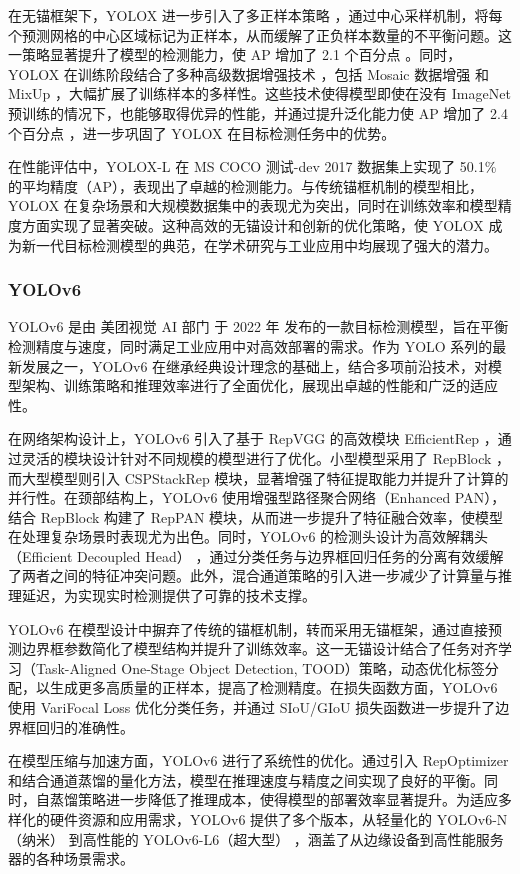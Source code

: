 \documentclass[11pt,twocolumn]{ctexart}
\begin{document}
在无锚框架下，YOLOX 进一步引入了多正样本策略 ，通过中心采样机制，将每个预测网格的中心区域标记为正样本，从而缓解了正负样本数量的不平衡问题。这一策略显著提升了模型的检测能力，使 AP 增加了 2.1 个百分点 。同时，YOLOX 在训练阶段结合了多种高级数据增强技术 ，包括 Mosaic 数据增强 和 MixUp ，大幅扩展了训练样本的多样性。这些技术使得模型即使在没有 ImageNet 预训练的情况下，也能够取得优异的性能，并通过提升泛化能力使 AP 增加了 2.4 个百分点 ，进一步巩固了 YOLOX 在目标检测任务中的优势。

在性能评估中，YOLOX-L 在 MS COCO 测试-dev 2017 数据集上实现了 50.1\% 的平均精度（AP），表现出了卓越的检测能力。与传统锚框机制的模型相比，YOLOX 在复杂场景和大规模数据集中的表现尤为突出，同时在训练效率和模型精度方面实现了显著突破。这种高效的无锚设计和创新的优化策略，使 YOLOX 成为新一代目标检测模型的典范，在学术研究与工业应用中均展现了强大的潜力。
\subsubsection{YOLOv6}
YOLOv6 是由 美团视觉 AI 部门 于 2022 年 发布的一款目标检测模型，旨在平衡检测精度与速度，同时满足工业应用中对高效部署的需求。作为 YOLO 系列的最新发展之一，YOLOv6 在继承经典设计理念的基础上，结合多项前沿技术，对模型架构、训练策略和推理效率进行了全面优化，展现出卓越的性能和广泛的适应性。

在网络架构设计上，YOLOv6 引入了基于 RepVGG 的高效模块 EfficientRep ，通过灵活的模块设计针对不同规模的模型进行了优化。小型模型采用了 RepBlock ，而大型模型则引入 CSPStackRep 模块，显著增强了特征提取能力并提升了计算的并行性。在颈部结构上，YOLOv6 使用增强型路径聚合网络（Enhanced PAN），结合 RepBlock 构建了 RepPAN 模块，从而进一步提升了特征融合效率，使模型在处理复杂场景时表现尤为出色。同时，YOLOv6 的检测头设计为高效解耦头（Efficient Decoupled Head） ，通过分类任务与边界框回归任务的分离有效缓解了两者之间的特征冲突问题。此外，混合通道策略的引入进一步减少了计算量与推理延迟，为实现实时检测提供了可靠的技术支撑。

YOLOv6 在模型设计中摒弃了传统的锚框机制，转而采用无锚框架，通过直接预测边界框参数简化了模型结构并提升了训练效率。这一无锚设计结合了任务对齐学习（Task-Aligned One-Stage Object Detection, TOOD）策略，动态优化标签分配，以生成更多高质量的正样本，提高了检测精度。在损失函数方面，YOLOv6 使用 VariFocal Loss 优化分类任务，并通过 SIoU/GIoU 损失函数进一步提升了边界框回归的准确性。

在模型压缩与加速方面，YOLOv6 进行了系统性的优化。通过引入 RepOptimizer 和结合通道蒸馏的量化方法，模型在推理速度与精度之间实现了良好的平衡。同时，自蒸馏策略进一步降低了推理成本，使得模型的部署效率显著提升。为适应多样化的硬件资源和应用需求，YOLOv6 提供了多个版本，从轻量化的 YOLOv6-N（纳米） 到高性能的 YOLOv6-L6（超大型） ，涵盖了从边缘设备到高性能服务器的各种场景需求。
\end{document}
